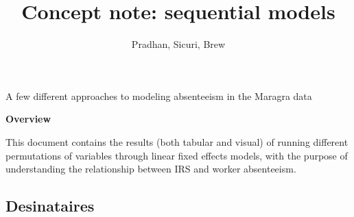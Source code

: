 \documentclass[]{article}
\title{Concept note: sequential models}
\subtitle{Pradhan, Sicuri, Brew}
\author{}
\date{}
\begin{document}
\maketitle

\begin{center}
\begin{large}

A few different approaches to modeling absenteeism in the Maragra data

\end{large}
\end{center}

\vspace{5mm}

\begin{center}
\textbf{Overview}  
\end{center}

\vspace{5mm}

\begin{center}
\begin{changemargin}{3cm}{3cm} 

This document contains the results (both tabular and visual) of running different permutations of variables through linear fixed effects models, with the purpose of understanding the relationship between IRS and worker absenteeism.

\end{changemargin}
\end{center}

\vspace{20mm}

\noindent{}

\vfill
\null

\subsection*{Desinataires}
\end{document}
